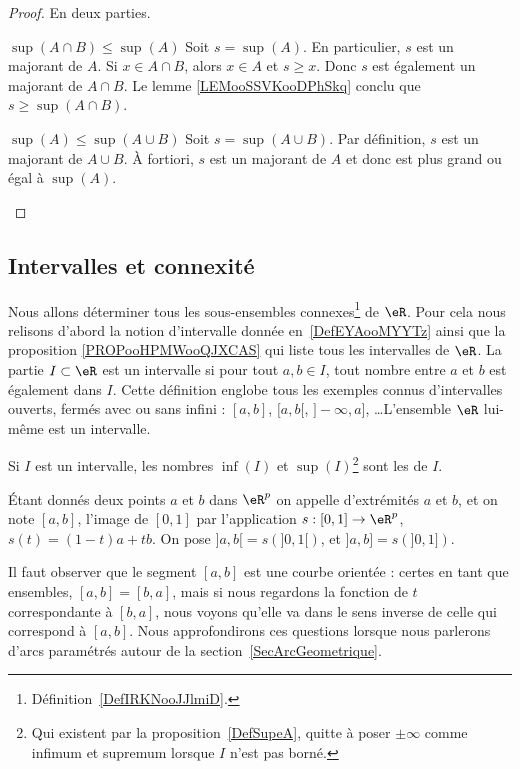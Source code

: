 \begin{proof}
    En deux parties.
    \begin{subproof}
        \item[$ \sup(A\cap B)\leq \sup(A)$ ]
            Soit \( s=\sup(A)\). En particulier, \( s\) est un majorant de \( A\). Si \( x\in A\cap B\), alors \( x\in A\) et \( s\geq x\). Donc \( s\) est également un majorant de \( A\cap B\). Le lemme \ref{LEMooSSVKooDPhSkq} conclu que \( s\geq \sup(A\cap B)\).    

        \item[$ \sup(A)\leq \sup(A\cup B)$ ]
            Soit \( s=\sup(A\cup B)\). Par définition, \( s\) est un majorant de \( A\cup B\). À fortiori, \( s\) est un majorant de \( A\) et donc est plus grand ou égal à \( \sup(A)\).
    \end{subproof}
\end{proof}

\subsection{Intervalles et connexité}

Nous allons déterminer tous les sous-ensembles connexes\footnote{Définition~\ref{DefIRKNooJJlmiD}.} de $\eR$. Pour cela nous relisons d'abord la notion d'intervalle donnée en~\ref{DefEYAooMYYTz} ainsi que la proposition \ref{PROPooHPMWooQJXCAS} qui liste tous les intervalles de \( \eR\). La partie \( I\subset \eR\) est un intervalle si pour tout \( a,b\in I\), tout nombre entre \( a\) et \( b\) est également dans \( I\). Cette définition englobe tous les exemples connus d'intervalles ouverts, fermés avec ou sans infini : $[a,b]$, $[a,b[$, $]-\infty,a]$, \ldots L'ensemble \( \eR\) lui-même est un intervalle.

Si \( I\) est un intervalle, les nombres \( \inf(I)\) et \( \sup(I)\)\footnote{Qui existent par la proposition~\ref{DefSupeA}, quitte à poser \( \pm\infty\) comme infimum et supremum lorsque \( I\) n'est pas borné.} sont les  de \( I\).

\begin{definition}      \label{DefLISOooDHLQrl}
	Étant donnés deux points $a$ et $b$ dans $\eR^p$ on appelle  d'extrémités $a$ et $b$, et on note $[a,b]$, l'image de $[0,1]$ par l'application $s: [0,1]\to \eR^p$, $s(t)= (1-t)a+tb$.  On pose $]a,b[=s\left(]0,1[\right)$, et  $]a,b]=s\left(]0,1]\right)$.
\end{definition}
Il faut observer que le segment $[a,b]$ est une courbe orientée : certes en tant que ensembles, $[a,b]=[b,a]$, mais si nous regardons la fonction de $t$ correspondante à $[b,a]$, nous voyons qu'elle va dans le sens inverse de celle qui correspond à $[a,b]$. Nous approfondirons ces questions lorsque nous parlerons d'arcs paramétrés autour de la section~\ref{SecArcGeometrique}.

